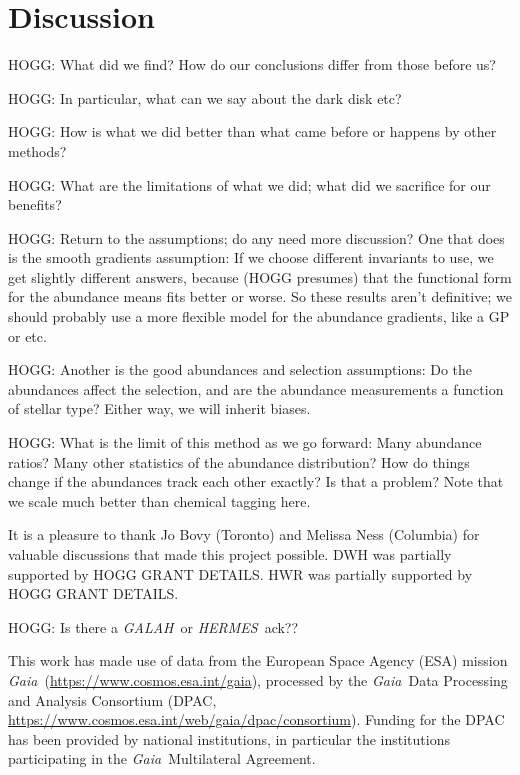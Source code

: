 \documentclass[modern]{aastex62}
\newcommand{\acronym}[1]{{\small{#1}}}
\newcommand{\project}[1]{\textsl{#1}}
\newcommand{\galah}{\project{\acronym{GALAH}}}
\newcommand{\gaia}{\project{Gaia}}
\newcommand{\hermes}{\project{\acronym{HERMES}}}
\begin{document}
\section{Discussion}

HOGG: What did we find? How do our conclusions differ from those before us?

HOGG: In particular, what can we say about the dark disk etc?

HOGG: How is what we did better than what came before or happens by other methods?

HOGG: What are the limitations of what we did; what did we sacrifice for our benefits?

HOGG: Return to the assumptions; do any need more discussion? One that does is the smooth
gradients assumption: If we choose different invariants to use, we get slightly different
answers, because (HOGG presumes) that the functional form for the abundance means fits
better or worse. So these results aren't definitive; we should probably use a more flexible
model for the abundance gradients, like a GP or etc.

HOGG: Another is the good abundances and selection assumptions: Do the abundances affect
the selection, and are the abundance measurements a function of stellar type? Either way,
we will inherit biases.

HOGG: What is the limit of this method as we go forward: Many abundance ratios? Many other
statistics of the abundance distribution? How do things change if the abundances track
each other exactly? Is that a problem? Note that we scale much better than chemical tagging
here.

\acknowledgements
It is a pleasure to thank
  Jo Bovy (Toronto)
  and
  Melissa Ness (Columbia)
for valuable discussions that made this project possible.
DWH was partially supported by HOGG GRANT DETAILS.
HWR was partially supported by HOGG GRANT DETAILS.

HOGG: Is there a \galah\ or \hermes\ ack??

This work has made use of data from the European Space Agency (\acronym{ESA}) mission
\gaia\ (\url{https://www.cosmos.esa.int/gaia}), processed by the \gaia\ Data
Processing and Analysis Consortium (\acronym{DPAC},
\url{https://www.cosmos.esa.int/web/gaia/dpac/consortium}). Funding for the
\acronym{DPAC}
has been provided by national institutions, in particular the institutions
participating in the \gaia\ Multilateral Agreement.

\facilities{
\gaia,
\galah,
\hermes
}
\end{document}
